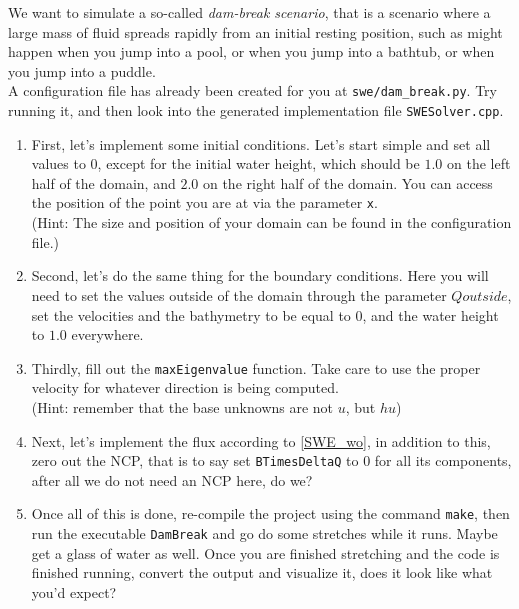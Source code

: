 \documentclass[12pt,letterpaper]{article}
\begin{document}
We want to simulate a so-called \textit{dam-break scenario}, that is a scenario where a large mass of fluid spreads rapidly from an
initial resting position, such as might happen when you jump into a pool, or when you jump into a bathtub, or when you jump into a puddle. \\
A configuration file has already been created for you at \texttt{swe/dam\_break.py}.
Try running it, and then look into the generated implementation file \texttt{SWESolver.cpp}.\\

\begin{enumerate}
    \item
        First, let's implement some initial conditions. Let's start simple and set all values to $0$, except for the initial water height,
        which should be $1.0$ on the left half of the domain, and $2.0$ on the right half of the domain.
        You can access the position of the point you are at via the parameter \texttt{x}.\\
        (Hint: The size and position of your domain can be found in the configuration file.)
    \item
        Second, let's do the same thing for the boundary conditions. Here you will need to set the values outside of the domain through the
        parameter $Qoutside$, set the velocities and the bathymetry to be equal to $0$, and the water height to $1.0$ everywhere.
    \item
        Thirdly, fill out the \texttt{maxEigenvalue} function. Take care to use the proper velocity for whatever direction is being computed.\\
        (Hint: remember that the base unknowns are not $u$, but $hu$)
    \item
        Next, let's implement the flux according to \ref{SWE_wo}, in addition to this, zero out the NCP, that is to say set \texttt{BTimesDeltaQ} to $0$
        for all its components, after all we do not need an NCP here, do we?
    \item
        Once all of this is done, re-compile the project using the command \texttt{make},
        then run the executable \texttt{DamBreak} and go do some stretches while it runs.
        Maybe get a glass of water as well. Once you are finished stretching and the code is finished running,
        convert the output and visualize it, does it look like what you'd expect?
\end{enumerate}

\vspace{1cm}
\end{document}

